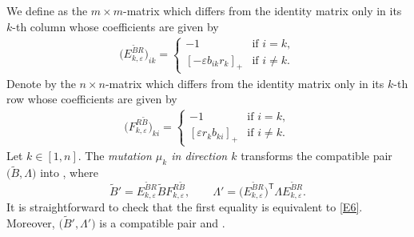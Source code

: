 \documentclass[pdftex]{sigma}
\numberwithin{equation}{section}
\begin{document}
We define  as the $m\times m$-matrix which differs from the identity matrix only in its $k$-th column whose coefficients are given by
 \begin{align*}
 \bigl(E_{k,\varepsilon}^{\tilde{B}R}\bigr)_{ik}=\begin{cases}
 -1& \text{if } i=k,\\
 [-\varepsilon b_{ik}r_k]_+& \text{if } i\neq k.
 \end{cases}
 \end{align*}
 Denote by  the $n\times n$-matrix which differs from the identity matrix only in its $k$-th row whose coefficients are given by
 \begin{align*}
 \bigl(F^{R\tilde{B}}_{k,\varepsilon}\bigr)_{ki}=\begin{cases}
 -1& \text{if } i=k,\\
 [\varepsilon r_{k}b_{ki}]_+& \text{if } i\neq k.
 \end{cases}
 \end{align*}
Let $k\in [1,n]$.
The {\it mutation $\mu_k$ in direction $k$} transforms the compatible pair $\bigl(\tilde{B},\Lambda\bigr)$ into , where
\[
\tilde{B}'=E_{k,\varepsilon}^{\tilde{B}R}\tilde{B}F_{k,\varepsilon}^{R\tilde{B}},\qquad \Lambda'=\bigl(E_{k,\varepsilon}^{\tilde{B}R}\bigr)^{\mathsf T}\Lambda E_{k,\varepsilon}^{\tilde{B}R}.
\]
It is straightforward to check that the first equality is equivalent to \eqref{E6}. Moreover, $\bigl(\tilde{B}', \Lambda'\bigr)$ is a compatible pair and .
\end{document}
